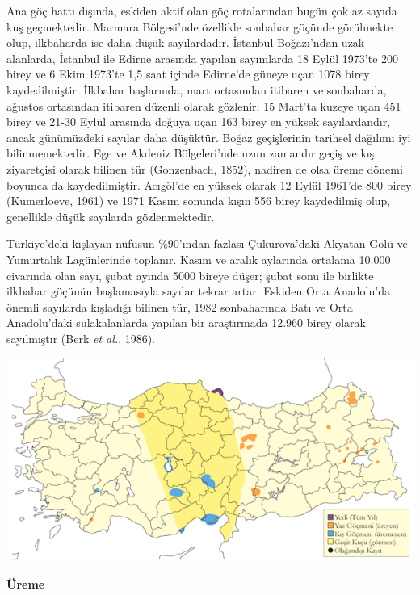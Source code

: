 \documentclass[
  a4paper,
  DIV=11,
  numbers=noendperiod]{scrreprt}
\begin{document}
Ana göç hattı dışında, eskiden aktif olan göç rotalarından bugün çok az
sayıda kuş geçmektedir. Marmara Bölgesi'nde özellikle sonbahar göçünde
görülmekte olup, ilkbaharda ise daha düşük sayılardadır. İstanbul
Boğazı'ndan uzak alanlarda, İstanbul ile Edirne arasında yapılan
sayımlarda 18 Eylül 1973'te 200 birey ve 6 Ekim 1973'te 1,5 saat içinde
Edirne'de güneye uçan 1078 birey kaydedilmiştir. İlkbahar başlarında,
mart ortasından itibaren ve sonbaharda, ağustos ortasından itibaren
düzenli olarak gözlenir; 15 Mart'ta kuzeye uçan 451 birey ve 21-30 Eylül
arasında doğuya uçan 163 birey en yüksek sayılardandır, ancak
günümüzdeki sayılar daha düşüktür. Boğaz geçişlerinin tarihsel dağılımı
iyi bilinmemektedir. Ege ve Akdeniz Bölgeleri'nde uzun zamandır geçiş ve
kış ziyaretçisi olarak bilinen tür (Gonzenbach, 1852), nadiren de olsa
üreme dönemi boyunca da kaydedilmiştir. Acıgöl'de en yüksek olarak 12
Eylül 1961'de 800 birey (Kumerloeve, 1961) ve 1971 Kasım sonunda kışın
556 birey kaydedilmiş olup, genellikle düşük sayılarda gözlenmektedir.

Türkiye'deki kışlayan nüfusun \%90'ından fazlası Çukurova'daki Akyatan
Gölü ve Yumurtalık Lagünlerinde toplanır. Kasım ve aralık aylarında
ortalama 10.000 civarında olan sayı, şubat ayında 5000 bireye düşer;
şubat sonu ile birlikte ilkbahar göçünün başlamasıyla sayılar tekrar
artar. Eskiden Orta Anadolu'da önemli sayılarda kışladığı bilinen tür,
1982 sonbaharında Batı ve Orta Anadolu'daki sulakalanlarda yapılan bir
araştırmada 12.960 birey olarak sayılmıştır (Berk \emph{et al.}, 1986).

\includegraphics{images/harita_Page_126.png}

\textbf{Üreme}
\end{document}
